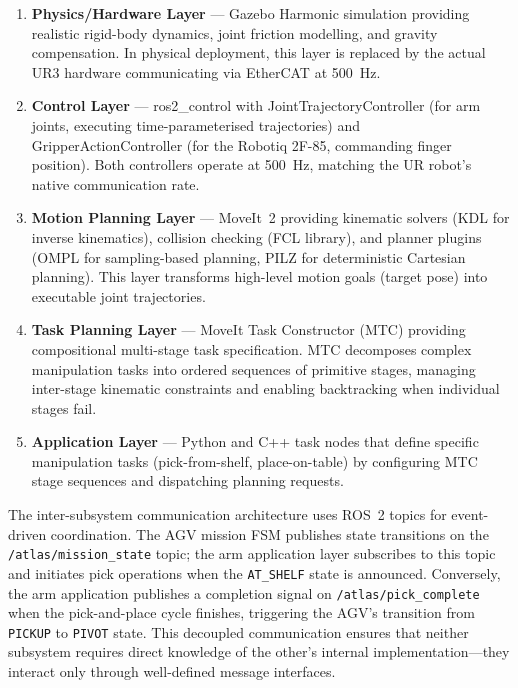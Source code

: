 \documentclass[12pt,a4paper,oneside]{report}
\begin{document}
\begin{enumerate}
\item \textbf{Physics/Hardware Layer} --- Gazebo Harmonic simulation providing realistic rigid-body dynamics, joint friction modelling, and gravity compensation. In physical deployment, this layer is replaced by the actual UR3 hardware communicating via EtherCAT at 500~Hz.

\item \textbf{Control Layer} --- ros2\_control with JointTrajectoryController (for arm joints, executing time-parameterised trajectories) and GripperActionController (for the Robotiq 2F-85, commanding finger position). Both controllers operate at 500~Hz, matching the UR robot's native communication rate.

\item \textbf{Motion Planning Layer} --- MoveIt~2 providing kinematic solvers (KDL for inverse kinematics), collision checking (FCL library), and planner plugins (OMPL for sampling-based planning, PILZ for deterministic Cartesian planning). This layer transforms high-level motion goals (target pose) into executable joint trajectories.

\item \textbf{Task Planning Layer} --- MoveIt Task Constructor (MTC) providing compositional multi-stage task specification. MTC decomposes complex manipulation tasks into ordered sequences of primitive stages, managing inter-stage kinematic constraints and enabling backtracking when individual stages fail.

\item \textbf{Application Layer} --- Python and C++ task nodes that define specific manipulation tasks (pick-from-shelf, place-on-table) by configuring MTC stage sequences and dispatching planning requests.
\end{enumerate}

The inter-subsystem communication architecture uses ROS~2 topics for event-driven coordination. The AGV mission FSM publishes state transitions on the \texttt{/atlas/mission\_state} topic; the arm application layer subscribes to this topic and initiates pick operations when the \texttt{AT\_SHELF} state is announced. Conversely, the arm application publishes a completion signal on \texttt{/atlas/pick\_complete} when the pick-and-place cycle finishes, triggering the AGV's transition from \texttt{PICKUP} to \texttt{PIVOT} state. This decoupled communication ensures that neither subsystem requires direct knowledge of the other's internal implementation---they interact only through well-defined message interfaces.
\end{document}
